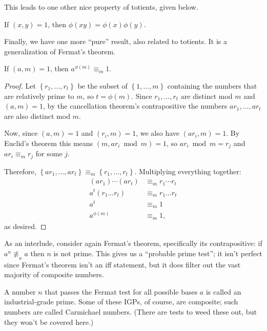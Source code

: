 \documentclass[../m055main.tex]{subfiles}
\begin{document}
This leads to one other nice property of totients, given below.

\begin{corollary}
    If $(x,y) = 1$, then $\phi (xy) = \phi (x) \phi (y)$.
\end{corollary}

Finally, we have one more ``pure'' result, also related to totients.
It is a generalization of Fermat's theorem.

\pagebreak

\begin{theorem}
    If $(a,m) = 1$, then $a^{\phi (m)} \equiv_m 1$.
\end{theorem}

\begin{proof}
    Let $\left\{ r_1, \ldots, r_t \right\}$ be the subset of $\left\{ 1, \ldots, m \right\}$ containing the numbers that are relatively prime to $m$, so $t = \phi (m)$.
    Since $r_1, \ldots, r_t$ are distinct mod $m$ and $(a,m) = 1$, by the cancellation theorem's contrapositive the numbers $ar_1, \ldots, ar_t$ are also distinct mod $m$.

    Now, since $(a, m) = 1$ and $(r_i, m) = 1$, we also have $(ar_i, m) = 1$.
    By Euclid's theorem this means $(m, ar_i \bmod m) = 1$, so $ar_i \bmod m = r_j$ and $ar_i \equiv_m r_j$ for some $j$.

    Therefore, $\left\{ ar_1, \ldots, ar_t \right\} \equiv_m \left\{ r_1, \ldots, r_t \right\}$.
    Multiplying everything together:
    \begin{align*}
        (ar_1) \cdots (ar_t) &\equiv_m r_1 \cdots r_t \\
        a^t (r_1 \ldots r_t) &\equiv_m r_1 \ldots r_t \\
        a^t &\equiv_m 1 \\
        a^{\phi (m)} &\equiv_m 1,
    \end{align*}
    as desired.
\end{proof}

As an interlude, consider again Fermat's theorem, specifically its contrapositive: if $a^n \not\equiv_n a$ then $n$ is not prime.
This gives us a ``probable prime test''; it isn't perfect since Fermat's theorem isn't an iff statement, but it does filter out the vast majority of composite numbers.

A number $n$ that passes the Fermat test for all possible bases $a$ is called an industrial-grade prime.
Some of these IGPs, of course, are composite; such numbers are called Carmichael numbers.
(There are tests to weed these out, but they won't be covered here.)
\end{document}
